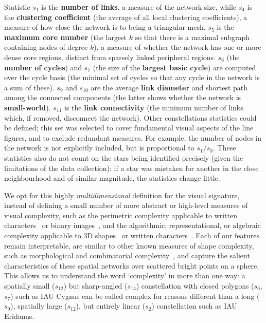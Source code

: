 \documentclass[10pt]{article}
\begin{document}
Statistic $s_1$ is the {\bf number of links}, a measure of the network size, while $s_4$ is the {\bf clustering coefficient} (the average of all local clustering coefficients), a measure of how close the network is to being a triangular mesh. $s_5$ is the {\bf maximum core number} (the largest $k$ so that there is a maximal subgraph containing nodes of degree $k$), a measure of whether the network has one or more dense core regions, distinct from sparsely linked peripheral regions. $s_6$ (the {\bf number of cycles}) and $s_7$ (the size of the {\bf largest basic cycle}) are computed over the cycle basis (the minimal set of cycles so that any cycle in the network is a sum of these). $s_9$ and $s_{10}$ are the average {\bf link diameter} and shortest path among the connected components (the latter shows whether the network is {\bf small-world}). $s_{11}$ is the {\bf link connectivity} (the minimum number of links which, if removed, disconnect the network). Other constellations statistics could be defined; this set was selected to cover fundamental visual aspects of the line figures, and to exclude redundant measures. For example, the number of nodes in the network is not explicitly included, but is proportional to $s_1 / s_3$. These statistics also do not count on the stars being identified precisely (given the limitations of the data collection): if a star was mistaken for another in the close neighbourhood and of similar magnitude, the statistics change little. 

We opt for this highly \emph{multidimensional} definition for the visual signature, instead of defining a small number of more abstract or high-level measures of visual complexity, such as the perimetric complexity applicable to written characters~\cite{miton2021graphic} or binary images~\cite{watson2012perimetric}, and the algorithmic, representational, or algebraic complexity applicable to 3D shapes~\cite{rossignac2005shape} or written characters~\cite{miton2021graphic}. Each of our features remain interpretable, are similar to other known measures of shape complexity, such as morphological and combinatorial complexity~\cite{rossignac2005shape}, and capture the salient characteristics of these spatial networks over scattered bright points on a sphere. This allows us to understand the word `complexity' in more than one way: a spatially small ($s_{12}$) but sharp-angled ($s_{14}$) constellation with closed polygons ($s_6$, $s_7$) such as IAU Cygnus can be called complex for reasons different than a long ($s_9$), spatially large ($s_{12}$), but entirely linear ($s_2$) constellation such as IAU Eridanus. 
\end{document}
